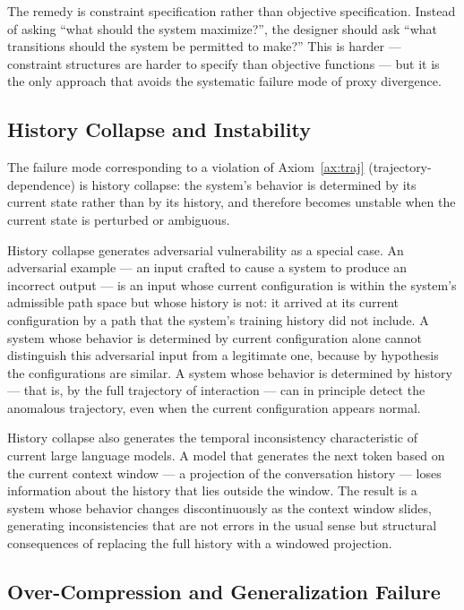 \documentclass[12pt, twoside]{article}
\theoremstyle{plain}
\theoremstyle{definition}
\theoremstyle{remark}
\begin{document}
The remedy is constraint specification rather than objective specification.
Instead of asking ``what should the system maximize?'',
the designer should ask ``what transitions should the system
be permitted to make?''
This is harder — constraint structures are harder to specify than
objective functions — but it is the only approach that avoids
the systematic failure mode of proxy divergence.

\subsection{History Collapse and Instability}

The failure mode corresponding to a violation of
Axiom~\ref{ax:traj} (trajectory-dependence) is history collapse:
the system's behavior is determined by its current state
rather than by its history, and therefore becomes unstable
when the current state is perturbed or ambiguous.

History collapse generates adversarial vulnerability as a special case.
An adversarial example — an input crafted to cause a system
to produce an incorrect output — is an input whose current
configuration is within the system's admissible path space
but whose history is not: it arrived at its current configuration
by a path that the system's training history did not include.
A system whose behavior is determined by current configuration
alone cannot distinguish this adversarial input from a legitimate one,
because by hypothesis the configurations are similar.
A system whose behavior is determined by history — that is,
by the full trajectory of interaction — can in principle detect
the anomalous trajectory, even when the current configuration
appears normal.

History collapse also generates the temporal inconsistency
characteristic of current large language models.
A model that generates the next token based on the current context
window — a projection of the conversation history —
loses information about the history that lies outside the window.
The result is a system whose behavior changes discontinuously
as the context window slides, generating inconsistencies
that are not errors in the usual sense but structural consequences
of replacing the full history with a windowed projection.

\subsection{Over-Compression and Generalization Failure}
\end{document}
